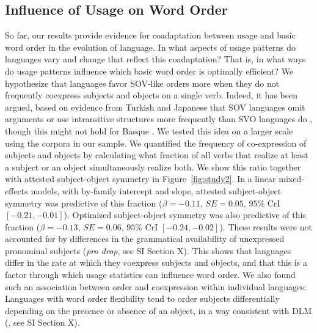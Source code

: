 \documentclass[11pt,a4paper]{article}
\begin{document}
\subsection*{Influence of Usage on Word Order}
So far, our results provide evidence for coadaptation between usage and basic word order in the evolution of language.
In what aspects of usage patterns do languages vary and change that reflect this coadaptation?
That is, in what ways do usage patterns influence which basic word order is optimally efficient?
We hypothesize that languages favor SOV-like orders more when they do not frequently coexpress subjects and objects on a single verb.
Indeed, it has been argued, based on evidence from Turkish and Japanese that SOV languages omit arguments or use intransitive structures more frequently than SVO languages do \citep{hiranuma1999syntactic,ueno2009does,luk2014investigating}, though this might not hold for Basque \citep{pastor2013processing}.
We tested this idea on a larger scale using the corpora in our sample.
We quantified the frequency of co-expression of subjects and objects by calculating what fraction of all verbs that realize at least a subject or an object simultaneously realize both.
We show this ratio together with attested subject-object symmetry in Figure~\ref{fig:study2}.
In a linear mixed-effects models, with by-family intercept and slope, attested subject-object symmetry was predictive of this fraction ($\beta=-0.11$, $SE=0.05$, $95\%$ CrI $[-0.21, -0.01]$).
Optimized subject-object symmetry was also predictive of this fraction ($\beta=-0.13$, $SE=0.06$, $95\%$ CrI $[-0.24,  -0.02]$).
These results were not accounted for by differences in the grammatical availability of unexpressed pronominal subjects (\textit{pro drop}, see SI Section X).
This shows that languages differ in the rate at which they coexpress subjects and objects, and that this is a factor through which usage statistics can influence word order.
We also found such an association between order and coexpression within individual languages: Languages with word order flexibility tend to order subjects differentially depending on the presence or absence of an object, in a way consistent with DLM (\citep{wals-82}, see SI Section X).


\end{document}
